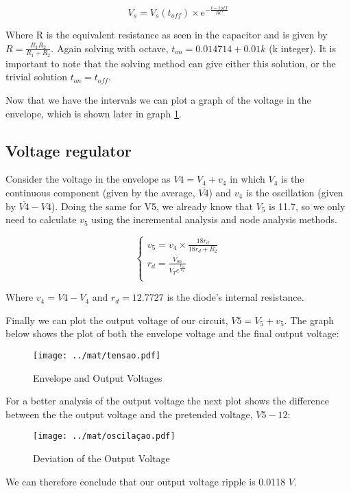 \begin{equation}\label{eq:t_on}
V_s=V_s(t_{off})\times e^{-\frac{t-t{off}}{RC}}
\end{equation}

Where R is the equivalent resistance as seen in the capacitor and is given by $R=\frac{R_1 R_2}{R_1 + R_2}$. Again solving with octave, $t_{on}=0.014714 + 0.01k$ (k integer). It is important to note that the solving method can give either this solution, or the trivial solution $t_{on}=t_{off}$.
\par
Now that we have the intervals we can plot a graph of the voltage in the envelope, which is shown later in graph \ref{fig:tensaoF}.

\subsection{Voltage regulator}
Consider the voltage in the envelope as $V4=V_4 + v_4$ in which $V_4$ is the continuous component (given by the average, $\overline{V4}$) and $v_4$ is the oscillation (given by $\overline{V4} - V4$).
Doing the same for V5, we already know that $V_5$ is 11.7, so we only need to calculate $v_5$ using the incremental analysis and node analysis methods.

\begin{equation}\label{eq:v_2}
\begin{cases}
v_5=v_4\times \frac{18 r_d}{18 r_d + R_2} \\
r_d=\frac{V_{on}}{V_T e^{\frac{V_{on}}{V_T}}}\\
\end{cases}
\end{equation}

Where $v_4= V4 - V_4$ and $r_d=12.7727$ is the diode's internal resistance.
\par
Finally we can plot the output voltage of our circuit, $V5=V_5 + v_5$. The graph below shows the plot of both the envelope voltage and the final output voltage:

\begin{figure}[H] \centering
\texttt{[image: ../mat/tensao.pdf]}
\caption{Envelope and Output Voltages}
\label{fig:tensaoF}
\end{figure}

For a better analysis of the output voltage the next plot shows the difference between the the output voltage and the pretended voltage, $V5-12$:

\begin{figure}[H] \centering
\texttt{[image: ../mat/oscilaçao.pdf]}
\caption{Deviation of the Output Voltage}
\label{fig:desvio}
\end{figure}

We can therefore conclude that our output voltage ripple is 0.0118 $V$.



